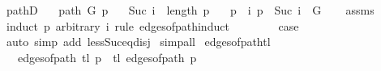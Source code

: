 \begin{isabellebody}
\endisatagproof
{\isafoldproof}%
%
\isadelimproof
\isanewline
%
\endisadelimproof
%
\isadeliminvisible
\isanewline
%
\endisadeliminvisible
%
\isataginvisible
{}\isamarkupfalse%
\ pathD{\isacharunderscore}{\kern0pt}{}{\isacharcolon}{\kern0pt}\isanewline
\ \ \ {\isachardoublequoteopen}path\ G\ p{\isachardoublequoteclose}\isanewline
\ \ \ {\isachardoublequoteopen}Suc\ i\ {\isacharless}{\kern0pt}\ length\ p{\isachardoublequoteclose}\isanewline
\ \ \ {\isachardoublequoteopen}{\isacharbraceleft}{\kern0pt}p\ {\isacharbang}{\kern0pt}\ i{\isacharcomma}{\kern0pt}\ p\ {\isacharbang}{\kern0pt}\ {\isacharparenleft}{\kern0pt}Suc\ i{\isacharparenright}{\kern0pt}{\isacharbraceright}{\kern0pt}\ {\isasymin}\ G{\isachardoublequoteclose}%
\endisataginvisible
{\isafoldinvisible}%
%
\isadeliminvisible
\isanewline
%
\endisadeliminvisible
%
\isadelimproof
\ \ %
\endisadelimproof
%
\isatagproof
{}\isamarkupfalse%
\ assms\isanewline
{}\isamarkupfalse%
\ {\isacharparenleft}{\kern0pt}induct\ p\ arbitrary{\isacharcolon}{\kern0pt}\ i\ rule{\isacharcolon}{\kern0pt}\ edges{\isacharunderscore}{\kern0pt}of{\isacharunderscore}{\kern0pt}path{\isachardot}{\kern0pt}induct{\isacharparenright}{\kern0pt}\isanewline
\ \ \isamarkupfalse%
\ {}\isanewline
\ \ \isamarkupfalse%
\ {\isacharquery}{\kern0pt}case\isanewline
\ \ \ \ \isamarkupfalse%
\ {\isacharparenleft}{\kern0pt}auto\ simp\ add{\isacharcolon}{\kern0pt}\ less{\isacharunderscore}{\kern0pt}Suc{\isacharunderscore}{\kern0pt}eq{\isacharunderscore}{\kern0pt}{}{\isacharunderscore}{\kern0pt}disj{\isacharparenright}{\kern0pt}\isanewline
{}\isamarkupfalse%
\ simp{\isacharunderscore}{\kern0pt}all%
\endisatagproof
{\isafoldproof}%
%
\isadelimproof
\isanewline
%
\endisadelimproof
%
\isadeliminvisible
\isanewline
%
\endisadeliminvisible
%
\isataginvisible
{}\isamarkupfalse%
\ edges{\isacharunderscore}{\kern0pt}of{\isacharunderscore}{\kern0pt}path{\isacharunderscore}{\kern0pt}tl{\isacharcolon}{\kern0pt}\isanewline
\ \ \ {\isachardoublequoteopen}edges{\isacharunderscore}{\kern0pt}of{\isacharunderscore}{\kern0pt}path\ {\isacharparenleft}{\kern0pt}tl\ p{\isacharparenright}{\kern0pt}\ {\isacharequal}{\kern0pt}\ tl\ {\isacharparenleft}{\kern0pt}edges{\isacharunderscore}{\kern0pt}of{\isacharunderscore}{\kern0pt}path\ p{\isacharparenright}{\kern0pt}{\isachardoublequoteclose}%
\endisataginvisible
{\isafoldinvisible}%
%
\isadeliminvisible

\end{isabellebody}
